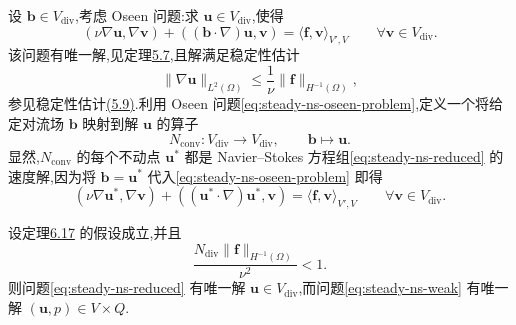 \begin{note}\label{note:steady-ns-oseen-operator}
设 $\bm{b}\in V_{\mathrm{div}}$,考虑 Oseen 问题:求 $\bm{u}\in V_{\mathrm{div}}$,使得
\begin{equation}\label{eq:steady-ns-oseen-problem}
  (\nu\nabla\bm{u},\nabla\bm{v})
    +((\bm{b}\cdot\nabla)\bm{u},\bm{v})
     =\langle\bm{f},\bm{v}\rangle_{V',V}
       \qquad\forall\bm{v}\in V_{\mathrm{div}}.
\end{equation}
该问题有唯一解,见定理\hyperref[thm:oseen-weak-existence-uniqueness]{5.7},且解满足稳定性估计
\begin{equation}\label{eq:steady-ns-oseen-stability}
  \|\nabla\bm{u}\|_{L^2(\Omega)}
    \le\frac1\nu\|\bm{f}\|_{H^{-1}(\Omega)},
\end{equation}
参见稳定性估计\hyperref[eq:oseen-stability-velocity-hminus1]{(5.9)}.利用 Oseen 问题\cref{eq:steady-ns-oseen-problem},定义一个将给定对流场 $\bm{b}$ 映射到解 $\bm{u}$ 的算子
\[
  N_{\mathrm{conv}}:V_{\mathrm{div}}\to V_{\mathrm{div}},
  \qquad\bm{b}\mapsto\bm{u}.
\]
显然,$N_{\mathrm{conv}}$ 的每个不动点 $\bm{u}^*$ 都是 Navier--Stokes 方程组\cref{eq:steady-ns-reduced} 的速度解,因为将 $\bm{b}=\bm{u}^*$ 代入\cref{eq:steady-ns-oseen-problem} 即得
\[
  (\nu\nabla\bm{u}^*,\nabla\bm{v})
    +((\bm{u}^*\cdot\nabla)\bm{u}^*,\bm{v})
       =\langle\bm{f},\bm{v}\rangle_{V',V}
       \qquad\forall\bm{v}\in V_{\mathrm{div}}.
\]
\end{note}

\begin{theorem}[小数据条件下解的存在唯一性]\label{thm:steady-ns-small-data}\label{thm:steady-ns-uniqueness}
设定理\hyperref[thm:steady-ns-existence]{6.17} 的假设成立,并且
\begin{equation}\label{eq:steady-ns-small-data-condition}
  \frac{N_{\mathrm{div}}\|\bm{f}\|_{H^{-1}(\Omega)}}{\nu^2}<1.
\end{equation}
则问题\cref{eq:steady-ns-reduced} 有唯一解 $\bm{u}\in V_{\mathrm{div}}$,而问题\cref{eq:steady-ns-weak} 有唯一解 $(\bm{u},p)\in V\times Q$.
\end{theorem}

